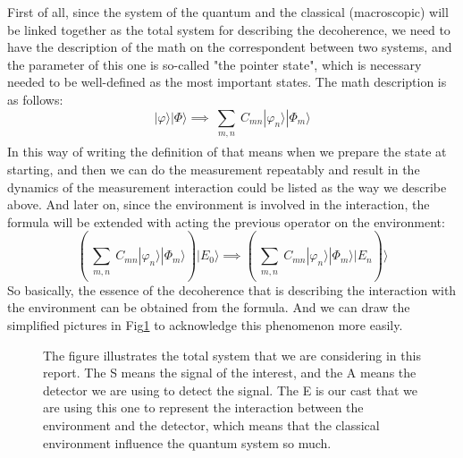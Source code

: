 \documentclass[final,1p,12pt]{elsarticle}
\begin{document}
First of all, since the system of the quantum and the classical (macroscopic)  will be linked together as the total system for describing the decoherence, we need to have the description of the math on the correspondent between two systems, and the parameter of this one is so-called "the pointer state", which is necessary needed to be well-defined as the most important states. The math description is as follows:\\
\begin{equation}
| \varphi \rangle | \Phi \rangle \implies \sum_{\substack{
   m,n\\
  }} C_{mn} | \varphi_{n} \rangle | \Phi_{m} \rangle
\end{equation}
In this way of writing the definition of that means when we prepare the state at starting, and then we can do the measurement repeatably and result in the dynamics of the measurement interaction could be listed as the way we describe above. And later on, since the environment is involved in the interaction, the formula will be extended with acting the previous operator on the environment: \\
\begin{equation}
 (\sum_{\substack{
   m,n\\
  }} C_{mn} | \varphi_{n} \rangle | \Phi_{m} \rangle) | E_{0} \rangle \implies  
 ( \sum_{\substack{
  m,n\\
  }} C_{mn} | \varphi_{n} \rangle | \Phi_{m} \rangle | E_{n} )\rangle 
\end{equation}
So basically, the essence of the decoherence that is describing the interaction with the environment can be obtained from the formula. And we can draw the simplified pictures in Fig\ref{77777} to acknowledge this phenomenon more easily.\\

\begin{figure}
\begin{center}
\end{center}
\caption{The figure illustrates the total system that we are considering in this report. The S means the signal of the interest, and the A means the detector we are using to detect the signal. The E is our cast that we are using this one to represent the interaction between the environment and the detector, which means that the classical environment influence the quantum system so much. }
\label{77777}
\end{figure}
\end{document}
